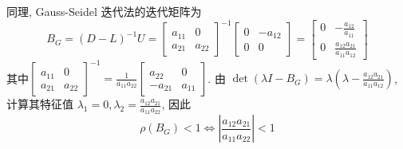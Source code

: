 \begin{tcolorbox}
同理, Gauss-Seidel 迭代法的迭代矩阵为  
$$
B_{G}=(D-L)^{-1}U=\left[\begin{array}{cc}
a_{11} & 0 \\
a_{21} & a_{22}
\end{array}\right]^{-1}\left[\begin{array}{cc}
0 & -a_{12} \\
0 & 0
\end{array}\right]=\left[\begin{array}{cc}
0 & -\frac{a_{12}}{a_{11}} \\
0 & \frac{a_{12} a_{21}}{a_{11} a_{12}}
\end{array}\right]
$$
其中$\left[\begin{array}{cc}
a_{11} & 0 \\
a_{21} & a_{22}
\end{array}\right]^{-1}=\frac{1}{a_{11}a_{22}}\left[\begin{array}{cc}
a_{22} & 0 \\
-a_{21} & a_{11}
\end{array}\right]$. 由 $ \operatorname{det}\left(\lambda I-B_{G}\right)=\lambda\left(\lambda-\frac{a_{12} a_{21}}{a_{11} a_{12}}\right) $, 计算其特征值 $ \lambda_{1}=0, \lambda_{2}=\frac{a_{12} a_{21}}{a_{11} a_{22}} $, 因此
$$
\rho\left(B_{G}\right)<1\iff \left|\frac{a_{12} a_{21}}{a_{11} a_{22}}\right|<1
$$

\end{tcolorbox}








